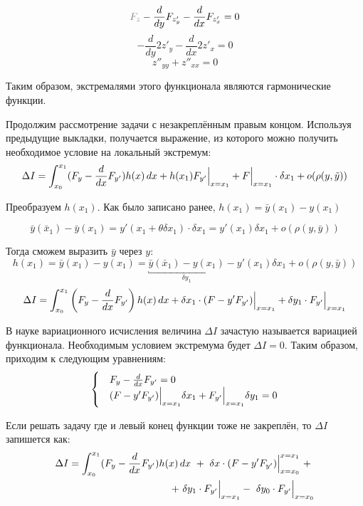 \documentclass[12pt]{article}
\begin{document}
	$$\off{F_z} - \frac{d}{dy} F_{z'_y} - \frac{d}{dx} F_{z'_x} = 0$$
	$$-\frac{d}{dy} 2z'_y - \frac{d}{dx} 2z'_x = 0$$
	$$z''_{yy} + z''_{xx} = 0$$
	
	Таким образом, экстремалями этого функционала являются гармонические функции.


	Продолжим рассмотрение задачи с незакреплённым правым концом. Используя предыдущие выкладки, получается 
	выражение, из которого можно получить необходимое условие на локальный экстремум:
	$$\Delta I = \int_{x_0}^{x_1} (F_y - \frac{d}{dx} F_{y'})h(x)\,dx + h(x_1)F_{y'}\Big|_{x=x_1}^{} + 
	  F\Big|_{x=x_1}^{}\cdot \delta x_1 + o(\rho(y,\tilde{y}))$$
	  
	Преобразуем $h(x_1)$. Как было записано ранее, $h(x_1) = \bar{y}(x_1) - y(x_1)$

	$$\bar{y}(\bar{x}_1) - \bar{y}(x_1) = y'(x_1 + \theta \delta x_1)\cdot \delta x_1 
	= y'(x_1) \delta x_1 + o(\rho(y, \bar{y}))$$

	Тогда сможем выразить $\bar{y}$ через $y$:
	$$h(x_1) = \bar{y}(x_1) - y(x_1) = \underbracket{\bar{y}(\bar{x}_1) - y(x_1)}_{\delta y_1}
	  - y'(x_1)\delta x_1 + o(\rho(y, \bar{y}))$$
	\begin{align*}
		\Delta I = \int_{x_0}^{x_1} \left(F_y - \frac{d}{dx}F_{y'}\right)h(x)\,dx
		+ \delta x_1\cdot(F - y'F_{y'}) \Big|_{x=x_1}^{}
		+ \delta y_1 \cdot F_{y'}\Big|_{x=x_1}^{}
	\end{align*}

	В науке вариационного исчисления величина $\Delta I$ зачастую называется вариацией функционала. Необходимым условием 
	экстремума будет $\Delta I = 0$. Таким образом, приходим к следующим уравнениям:
	\begin{equation}
	\label{eq:preTraversal}
	\begin{cases}
		&F_y - \frac{d}{dx} F_{y'} = 0 \\
		&(F - y'F_{y'})\Big|_{x = x_1}^{} \delta x_1 + F_{y'} \Big|_{x=x_1}^{}\delta y_1 = 0
	\end{cases} 
	\end{equation}

	 Если решать задачу где и левый конец функции тоже не закреплён, то $\Delta I$ запишется как:
	\begin{align*}
		\Delta I = \int_{x_0}^{x_1} (F_y - \frac{d}{dx}F_{y'})h(x)\,dx~+~ 
		\delta x\cdot(F - y'F_{y'})\Big|_{x = x_0}^{x = x_1}~+~ \\
		~+~\delta y_1 \cdot F_{y'} \Big|_{x=x_1}^{}-~\delta y_0 \cdot F_{y'} \Big|_{x=x_0}^{}
	\end{align*}
\end{document}
